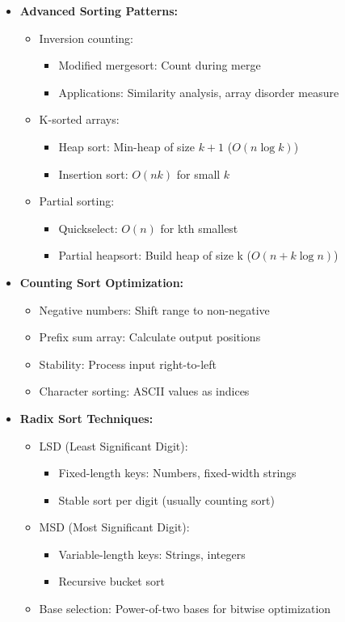 \documentclass[a4paper,10pt]{book}
\begin{document}
\begin{itemize}
    \item \textbf{Advanced Sorting Patterns:}
    \begin{itemize}
        \item Inversion counting:
        \begin{itemize}
            \item Modified mergesort: Count during merge
            \item Applications: Similarity analysis, array disorder measure
        \end{itemize}
        \item K-sorted arrays:
        \begin{itemize}
            \item Heap sort: Min-heap of size $k+1$ ($O(n \log k)$)
            \item Insertion sort: $O(nk)$ for small $k$
        \end{itemize}
        \item Partial sorting:
        \begin{itemize}
            \item Quickselect: $O(n)$ for kth smallest
            \item Partial heapsort: Build heap of size k ($O(n + k \log n)$)
        \end{itemize}
    \end{itemize}
    
    \item \textbf{Counting Sort Optimization:}
    \begin{itemize}
        \item Negative numbers: Shift range to non-negative
        \item Prefix sum array: Calculate output positions
        \item Stability: Process input right-to-left
        \item Character sorting: ASCII values as indices
    \end{itemize}
    
    \item \textbf{Radix Sort Techniques:}
    \begin{itemize}
        \item LSD (Least Significant Digit):
        \begin{itemize}
            \item Fixed-length keys: Numbers, fixed-width strings
            \item Stable sort per digit (usually counting sort)
        \end{itemize}
        \item MSD (Most Significant Digit):
        \begin{itemize}
            \item Variable-length keys: Strings, integers
            \item Recursive bucket sort
        \end{itemize}
        \item Base selection: Power-of-two bases for bitwise optimization
    \end{itemize}
    

\end{itemize}
\end{document}

